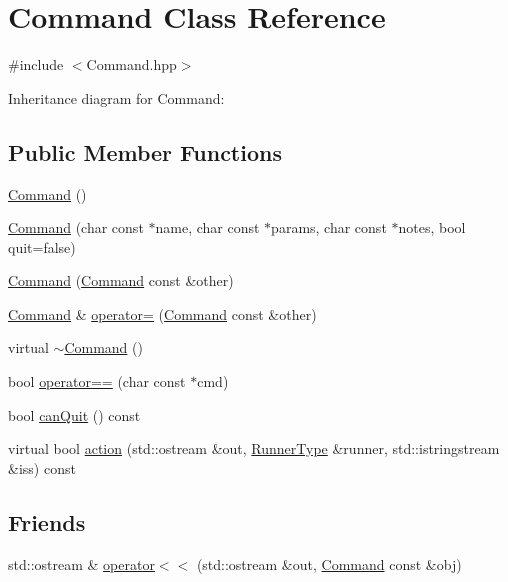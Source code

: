 \hypertarget{classCommand}{}\section{Command Class Reference}
\label{classCommand}


{\ttfamily \#include $<$Command.\+hpp$>$}



Inheritance diagram for Command\+:
\subsection*{Public Member Functions}
\begin{DoxyCompactItemize}
\item 
\hyperlink{classCommand_a18df2d81039392daeb0b78c346a70537}{Command} ()
\item 
\hyperlink{classCommand_ac26b14828c5a72f9bd370421a4788b5d}{Command} (char const $\ast$name, char const $\ast$params, char const $\ast$notes, bool quit=false)
\item 
\hyperlink{classCommand_a8ccab91a784c447f628ee8fec3873494}{Command} (\hyperlink{classCommand}{Command} const \&other)
\item 
\hyperlink{classCommand}{Command} \& \hyperlink{classCommand_a378451c967b9d585492a778bab58f803}{operator=} (\hyperlink{classCommand}{Command} const \&other)
\item 
virtual \hyperlink{classCommand_ab552bb3a07fdd1acbfd8ea76e69b2278}{$\sim$\+Command} ()
\item 
bool \hyperlink{classCommand_a75d6d67687c9d29e47ce9e80540bbd1e}{operator==} (char const $\ast$cmd)
\item 
bool \hyperlink{classCommand_a0ec10c9753786caf083aba08cf85afb0}{can\+Quit} () const
\item 
virtual bool \hyperlink{classCommand_ac423f5674fc858c0cc42f494943bc0d0}{action} (std\+::ostream \&out, \hyperlink{Command_8hpp_ad45c3de597c2023a8be0399d914161f4}{Runner\+Type} \&runner, std\+::istringstream \&iss) const
\end{DoxyCompactItemize}
\subsection*{Friends}
\begin{DoxyCompactItemize}
\item 
std\+::ostream \& \hyperlink{classCommand_a0a193e228644a3735c309d8b2b5b9899}{operator$<$$<$} (std\+::ostream \&out, \hyperlink{classCommand}{Command} const \&obj)
\end{DoxyCompactItemize}


